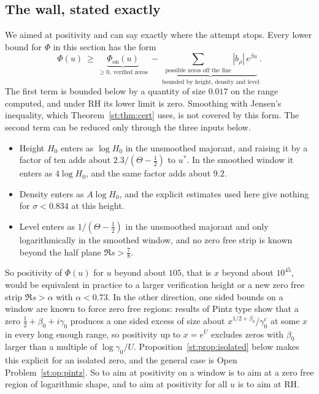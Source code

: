 \subsection{The wall, stated exactly}
We aimed at positivity and can say exactly where the attempt stops. Every lower bound for $\Phi$ in this section has the form
\[
\Phi(u)\ \ge\ \underbrace{\Phi_{\mathrm{on}}(u)}_{\ge0,\ \text{verified zeros}}\ -\ \underbrace{\sum_{\text{possible zeros off the line}}|b_\rho|\,e^{\beta u}}_{\text{bounded by height, density and level}} .
\]
The first term is bounded below by a quantity of size $0.017$ on the range computed, and under RH its lower limit is zero. Smoothing with Jensen's inequality, which Theorem~\ref{st:thm:cert} uses, is not covered by this form. The second term can be reduced only through the three inputs below.
\begin{itemize}
\item Height $H_0$ enters as $\log H_0$ in the unsmoothed majorant, and raising it by a factor of ten adds about $2.3/(\Theta-\tfrac12)$ to $u^*$. In the smoothed window it enters as $4\log H_0$, and the same factor adds about $9.2$.
\item Density enters as $A\log H_0$, and the explicit estimates used here give nothing for $\sigma<0.834$ at this height.
\item Level enters as $1/(\Theta-\tfrac12)$ in the unsmoothed majorant and only logarithmically in the smoothed window, and no zero free strip is known beyond the half plane $\Re s>\tfrac78$.
\end{itemize}
So positivity of $\Phi(u)$ for $u$ beyond about $105$, that is $x$ beyond about $10^{45}$, would be equivalent in practice to a larger verification height or a new zero free strip $\Re s>\alpha$ with $\alpha<0.73$. In the other direction, one sided bounds on a window are known to force zero free regions: results of Pintz type show that a zero $\tfrac12+\beta_0+i\gamma_0$ produces a one sided excess of size about $x^{1/2+\beta_0}/\gamma_0^{c}$ at some $x$ in every long enough range, so positivity up to $x=e^U$ excludes zeros with $\beta_0$ larger than a multiple of $\log\gamma_0/U$. Proposition~\ref{st:prop:isolated} below makes this explicit for an isolated zero, and the general case is Open Problem~\ref{st:op:pintz}. So to aim at positivity on a window is to aim at a zero free region of logarithmic shape, and to aim at positivity for all $u$ is to aim at RH.
